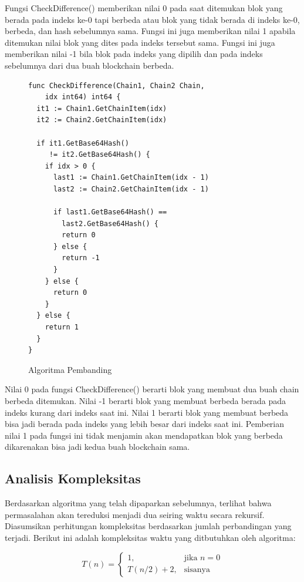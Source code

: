 \documentclass[10pt,conference]{IEEEtran}
\theoremstyle{definition}
\begin{document}
Fungsi CheckDifference() memberikan nilai 0 pada saat ditemukan blok yang berada pada indeks ke-0 tapi berbeda atau blok yang tidak berada di indeks ke-0, berbeda, dan hash sebelumnya sama. Fungsi ini juga memberikan nilai 1 apabila ditemukan nilai blok yang dites pada indeks tersebut sama. Fungsi ini juga memberikan nilai -1 bila blok pada indeks yang dipilih dan pada indeks sebelumnya dari dua buah blockchain berbeda.


\begin{figure}
    \begin{verbatim}
func CheckDifference(Chain1, Chain2 Chain,
    idx int64) int64 {
  it1 := Chain1.GetChainItem(idx)
  it2 := Chain2.GetChainItem(idx)
  
  if it1.GetBase64Hash() 
     != it2.GetBase64Hash() {
    if idx > 0 {
      last1 := Chain1.GetChainItem(idx - 1)
      last2 := Chain2.GetChainItem(idx - 1)
  
      if last1.GetBase64Hash() == 
        last2.GetBase64Hash() {
        return 0
      } else {
        return -1
      }
    } else {
      return 0
    }
  } else {
    return 1
  }
}        
    \end{verbatim}
    \caption{Algoritma Pembanding}
    \label{algo:2} 
\end{figure}

Nilai 0 pada fungsi CheckDifference() berarti blok yang membuat dua buah chain berbeda ditemukan. Nilai -1 berarti blok yang membuat berbeda berada pada indeks kurang dari indeks saat ini. Nilai 1 berarti blok yang  membuat berbeda bisa jadi berada pada indeks yang lebih besar dari indeks saat ini. Pemberian nilai 1 pada fungsi ini tidak menjamin akan mendapatkan blok yang berbeda dikarenakan bisa jadi kedua buah blockchain sama.

\subsection{Analisis Kompleksitas}
Berdasarkan algoritma yang telah dipaparkan sebelumnya, terlihat bahwa permasalahan akan tereduksi menjadi dua seiring waktu secara rekursif. Diasumsikan perhitungan kompleksitas berdasarkan jumlah perbandingan yang terjadi. Berikut ini adalah kompleksitas waktu yang ditbutuhkan oleh algoritma:

$$ 
T(n) =
\begin{cases}
    1, &\text{jika } n = 0\\
    T(n/2) + 2, &\text{sisanya}
\end{cases}
$$
\end{document}
